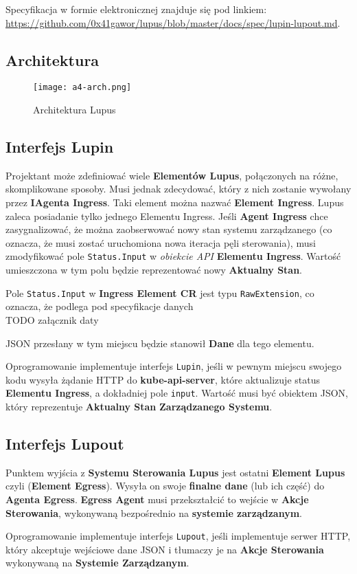 \label{appendix:4}

Specyfikacja w formie elektronicznej znajduje się pod linkiem: \url{https://github.com/0x41gawor/lupus/blob/master/docs/spec/lupin-lupout.md}.

\subsection{Architektura}

\begin{figure}[!h]
    \centering \texttt{[image: a4-arch.png]}
    \caption{Architektura Lupus}\label{fig:a4-arch}
\end{figure}

\subsection{Interfejs Lupin}

Projektant może zdefiniować wiele \textbf{Elementów Lupus}, połączonych na różne, skomplikowane sposoby. Musi jednak zdecydować, który z nich zostanie wywołany przez \textbf{IAgenta Ingress}. Taki element można nazwać \textbf{Element Ingress}. Lupus zaleca posiadanie tylko jednego Elementu Ingress.
Jeśli \textbf{Agent Ingress} chce zasygnalizować, że można zaobserwować nowy stan systemu zarządzanego (co oznacza, że musi zostać uruchomiona nowa iteracja pęli sterowania), musi zmodyfikować pole \texttt{Status.Input} w \textit{obiekcie API} \textbf{Elementu Ingress}. Wartość umieszczona w tym polu będzie reprezentować nowy \textbf{Aktualny Stan}.

Pole \texttt{Status.Input} w \textbf{Ingress Element CR} jest typu \texttt{RawExtension}, co oznacza, że podlega pod specyfikacje danych \\TODO załącznik daty

JSON przesłany w tym miejscu będzie stanowił \textbf{Dane} dla tego elementu.

Oprogramowanie implementuje interfejs \texttt{Lupin}, jeśli w pewnym miejscu swojego kodu wysyła żądanie HTTP do \textbf{kube-api-server}, które aktualizuje status \textbf{Elementu Ingress}, a dokładniej pole \texttt{input}. Wartość musi być obiektem JSON, który reprezentuje \textbf{Aktualny Stan} \textbf{Zarządzanego Systemu}. 

\subsection{Interfejs Lupout}

Punktem wyjścia z \textbf{Systemu Sterowania Lupus} jest ostatni \textbf{Element Lupus} czyli (\textbf{Element Egress}). Wysyła on swoje \textbf{finalne dane} (lub ich część) do \textbf{Agenta Egress}. \textbf{Egress Agent} musi przekształcić to wejście w \textbf{Akcje Sterowania}, wykonywaną bezpośrednio na \textbf{systemie zarządzanym}.

Oprogramowanie implementuje interfejs \texttt{Lupout}, jeśli implementuje serwer HTTP, który akceptuje wejściowe dane JSON i tłumaczy je na \textbf{Akcje Sterowania} wykonywaną na \textbf{Systemie Zarządzanym}. 

